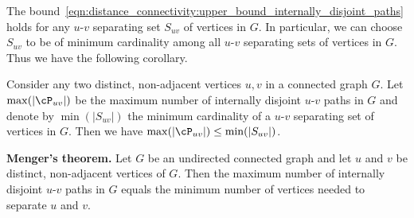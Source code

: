 The
bound~\eqref{eqn:distance_connectivity:upper_bound_internally_disjoint_paths}
holds for any $u$-$v$ separating set $S_{uv}$ of vertices in $G$. In
particular, we can choose $S_{uv}$ to be of minimum cardinality among
all $u$-$v$ separating sets of vertices in $G$. Thus we have the
following corollary.

\begin{corollary}
Consider any two distinct, non-adjacent vertices $u,v$ in a connected
graph $G$. Let $\max(|\cP_{uv}|)$ be the maximum number of internally
disjoint $u$-$v$ paths in $G$ and denote by $\min(|S_{uv}|)$ the
minimum cardinality of a $u$-$v$ separating set of vertices in
$G$. Then we have $\max(|\cP_{uv}|) \leq \min(|S_{uv}|)$.
\end{corollary}

\begin{theorem}
\textbf{Menger's theorem.}
Let $G$ be an undirected connected graph and let $u$ and $v$ be
distinct, non-adjacent vertices of $G$. Then the maximum number of
internally disjoint $u$-$v$ paths in $G$ equals the minimum number of
vertices needed to separate $u$ and $v$.
\end{theorem}

